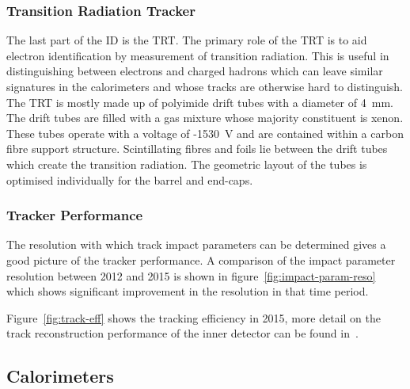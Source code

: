 \subsubsection{Transition Radiation Tracker}

The last part of the ID is the TRT. The primary role of the TRT is to aid
electron identification by measurement of transition radiation. This is useful
in distinguishing between electrons and charged hadrons which can leave similar
signatures in the calorimeters and whose tracks are otherwise hard to
distinguish. The TRT is mostly made up of polyimide drift tubes with a diameter
of 4~mm. The drift tubes are filled with a gas mixture whose majority
constituent is xenon. These tubes operate with a voltage of -1530~V and are
contained within a carbon fibre support structure. Scintillating fibres and
foils lie between the drift tubes which create the transition radiation.  The
geometric layout of the tubes is optimised individually for the barrel and
end-caps.

\subsubsection{Tracker Performance}
The resolution with which track impact parameters can be determined gives a good
picture of the tracker performance. A comparison of the impact parameter
resolution between 2012 and 2015 is shown in figure~\ref{fig:impact-param-reso}
which shows significant improvement in the resolution in that time period.

Figure~\ref{fig:track-eff} shows the tracking efficiency in 2015, more detail on
the track reconstruction performance of the inner detector can be found
in~\cite{ATL-PHYS-PUB-2015-018}.

\subsection{Calorimeters}%
\label{sec:calo}


